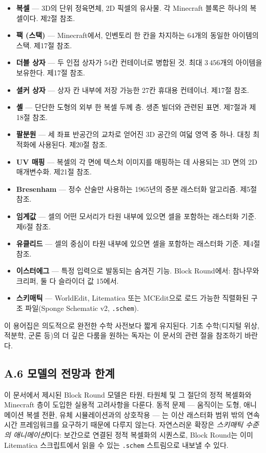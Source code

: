 \documentclass[12pt,a4paper]{scrartcl}
\newcommand{\code}[1]{\texttt{\small #1}}
\begin{document}
\begin{itemize}[leftmargin=1.4em,itemsep=0.18em,topsep=0.3em]
  \item \textbf{복셀} --- 3D의 단위 정육면체, 2D 픽셀의 유사물. 각 Minecraft 블록은 하나의 복셀이다. 제2절 참조.
  \item \textbf{팩 (스택)} --- Minecraft에서, 인벤토리 한 칸을 차지하는 64개의 동일한 아이템의 스택. 제17절 참조.
  \item \textbf{더블 상자} --- 두 인접 상자가 54칸 컨테이너로 병합된 것. 최대 $3\,456$개의 아이템을 보유한다. 제17절 참조.
  \item \textbf{셜커 상자} --- 상자 칸 내부에 저장 가능한 27칸 휴대용 컨테이너. 제17절 참조.
  \item \textbf{셸} --- 단단한 도형의 외부 한 복셀 두께 층. 생존 빌더와 관련된 표면. 제7절과 제18절 참조.
  \item \textbf{팔분원} --- 세 좌표 반공간의 교차로 얻어진 3D 공간의 여덟 영역 중 하나. 대칭 최적화에 사용된다. 제20절 참조.
  \item \textbf{UV 매핑} --- 복셀의 각 면에 텍스처 이미지를 매핑하는 데 사용되는 3D 면의 2D 매개변수화. 제21절 참조.
  \item \textbf{Bresenham} --- 정수 산술만 사용하는 1965년의 증분 래스터화 알고리즘. 제5절 참조.
  \item \textbf{임계값} --- 셀의 어떤 모서리가 타원 내부에 있으면 셀을 포함하는 래스터화 기준. 제6절 참조.
  \item \textbf{유클리드} --- 셀의 중심이 타원 내부에 있으면 셀을 포함하는 래스터화 기준. 제4절 참조.
  \item \textbf{이스터에그} --- 특정 입력으로 발동되는 숨겨진 기능. Block Round에서: 참나무와 크리퍼, 둘 다 슬라이더 값 15에서.
  \item \textbf{스키매틱} --- WorldEdit, Litematica 또는 MCEdit으로 로드 가능한 직렬화된 구조 파일(Sponge Schematic v2, \code{.schem}).
\end{itemize}

이 용어집은 의도적으로 완전한 수학 사전보다 짧게 유지된다. 기초 수학(디지털 위상, 적분학, 군론 등)의 더 깊은 다룸을 원하는 독자는 이 문서의 관련 절을 참조하기 바란다.

\subsection*{A.6 모델의 전망과 한계}

이 문서에서 제시된 Block Round 모델은 타원, 타원체 및 그 절단의 정적 복셀화와 Minecraft 층이 도입한 실용적 고려사항을 다룬다. 동적 문제 — 움직이는 도형, 애니메이션 복셀 전환, 유체 시뮬레이션과의 상호작용 — 는 이산 래스터화 범위 밖의 연속 시간 프레임워크를 요구하기 때문에 다루지 않는다. 자연스러운 확장은 \emph{스키매틱 수준의 애니메이션}이다: 보간으로 연결된 정적 복셀화의 시퀀스로, Block Round는 이미 Litematica 스크립트에서 읽을 수 있는 \code{.schem} 스트림으로 내보낼 수 있다.
\end{document}
